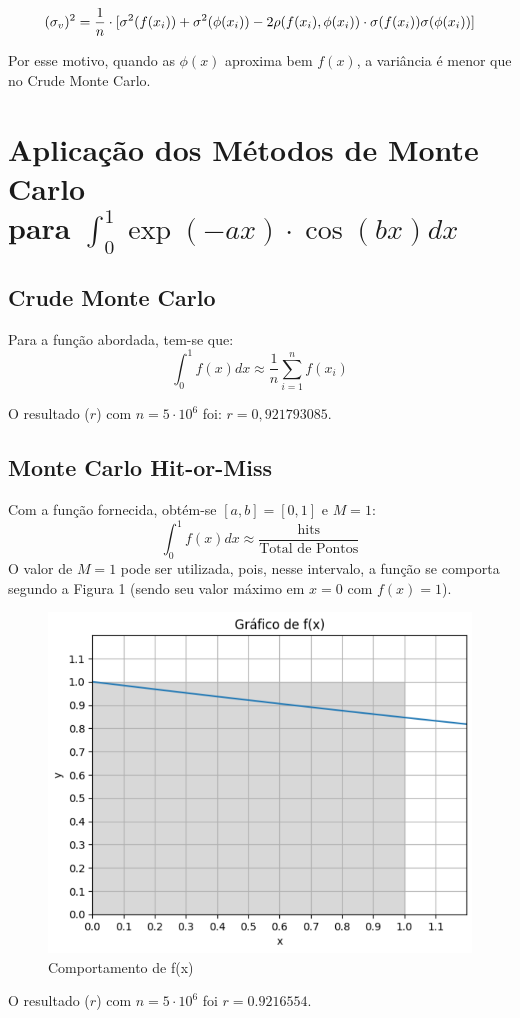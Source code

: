 \documentclass{article}
\begin{document}
\[
\text(\sigma_{v})^2 = \frac{1}{n}\cdot[\sigma^2(f(x_i)) + \sigma^2(\phi(x_i)) - 2\rho(f(x_i), \phi(x_i))\cdot\sigma(f(x_i))\sigma(\phi(x_i))]
\]

Por esse motivo, quando as $\phi(x)$ aproxima bem $f(x)$, a variância é menor que no Crude Monte Carlo.

\section{Aplicação dos Métodos de Monte Carlo\\ para
$\int_{0}^{1} \exp(-ax)\cdot\cos(bx) dx$}

\subsection{Crude Monte Carlo}

Para a função abordada, tem-se que:
\[
\text{$\int_0^1 f(x) dx$} \approx \frac{1}{n} \sum_{i=1}^{n} f(x_i)
\]

O resultado ($r$) com $n = 5\cdot10^6$ foi: $r = 0,921793085$.

\subsection{Monte Carlo Hit-or-Miss}

Com a função fornecida, obtém-se $[a,b] = [0, 1]$ e $M = 1$:
\[
\text{$\int_0^1 f(x) dx$} \approx \frac{\text{hits}}{\text{Total de Pontos}}
\]
O valor de $M=1$ pode ser utilizada, pois, nesse intervalo, a função se comporta segundo a Figura 1 (sendo seu valor máximo em $x = 0$ com $f(x) = 1$).

\begin{figure}[h]
\centering
\includegraphics[width=0.50\linewidth]{Gráfico f(x).png}
\caption{\label{fig:Gráfico 1} Comportamento de f(x)}
\end{figure}

O resultado ($r$) com $n = 5\cdot10^6$ foi $r = 0.9216554$.
\end{document}
